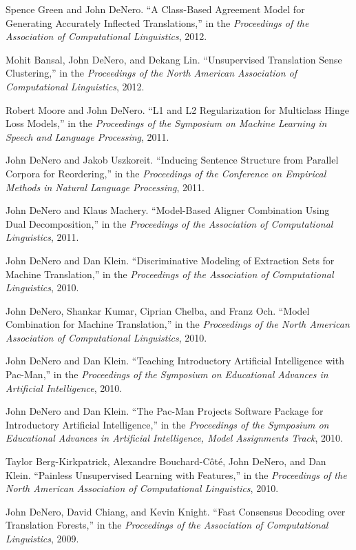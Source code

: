 \documentclass[margin,line]{res}
\begin{document}
\begin{resume}
Spence Green and John DeNero. ``A Class-Based Agreement Model for Generating Accurately Inflected Translations,'' in the {\it Proceedings of the Association of Computational Linguistics}, 2012.

Mohit Bansal, John DeNero, and Dekang Lin. ``Unsupervised Translation Sense Clustering,'' in the {\it Proceedings of the North American Association of Computational Linguistics}, 2012.

Robert Moore and John DeNero. ``L1 and L2 Regularization for Multiclass Hinge Loss Models,'' in the {\it Proceedings of the Symposium on Machine Learning in Speech and Language Processing}, 2011.

John DeNero and Jakob Uszkoreit.  ``Inducing Sentence Structure from Parallel Corpora for Reordering,'' in the {\it Proceedings of the Conference on Empirical Methods in Natural Language Processing}, 2011.

John DeNero and Klaus Machery. ``Model-Based Aligner Combination Using Dual Decomposition,'' in the {\it Proceedings of the Association of Computational Linguistics}, 2011.

John DeNero and Dan Klein. ``Discriminative Modeling of Extraction Sets for Machine Translation,'' in the {\it Proceedings of the Association of Computational Linguistics}, 2010.

John DeNero, Shankar Kumar, Ciprian Chelba, and Franz Och. ``Model Combination for Machine Translation,'' in the {\it Proceedings of the North American Association of Computational Linguistics}, 2010.

John DeNero and Dan Klein. ``Teaching Introductory Artificial Intelligence with Pac-Man,'' in the {\it Proceedings of the Symposium on Educational Advances in Artificial Intelligence}, 2010.

John DeNero and Dan Klein. ``The Pac-Man Projects Software Package for Introductory Artificial Intelligence,'' in the {\it Proceedings of the Symposium on Educational Advances in Artificial Intelligence, Model Assignments Track}, 2010.

Taylor Berg-Kirkpatrick, Alexandre Bouchard-Côté, John DeNero, and Dan Klein. ``Painless Unsupervised Learning with Features,'' in the {\it Proceedings of the North American Association of Computational Linguistics}, 2010.

John DeNero, David Chiang, and Kevin Knight. ``Fast Consensus Decoding over Translation Forests,'' in the {\it Proceedings of the Association of Computational Linguistics}, 2009.


\end{resume}
\end{document}
